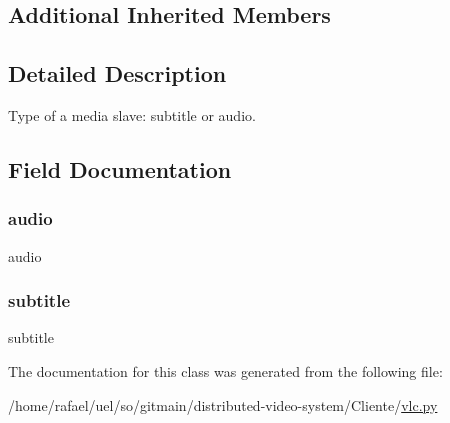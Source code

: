 \subsection*{Additional Inherited Members}


\subsection{Detailed Description}
\begin{DoxyVerb}Type of a media slave: subtitle or audio.
\end{DoxyVerb}
 

\subsection{Field Documentation}
\mbox{\label{classvlc_1_1_media_slave_type_ae7198e2df6ed905cb7395d0eff5d5d20}} 
\subsubsection{\texorpdfstring{audio}{audio}}
{\footnotesize\ttfamily audio\hspace{0.3cm}{\ttfamily [static]}}

\mbox{\label{classvlc_1_1_media_slave_type_acf9c7ca3fce6e014973ed5781029bdfb}} 
\subsubsection{\texorpdfstring{subtitle}{subtitle}}
{\footnotesize\ttfamily subtitle\hspace{0.3cm}{\ttfamily [static]}}



The documentation for this class was generated from the following file\+:\begin{DoxyCompactItemize}
\item 
/home/rafael/uel/so/gitmain/distributed-\/video-\/system/\+Cliente/\hyperlink{vlc_8py}{vlc.\+py}\end{DoxyCompactItemize}

